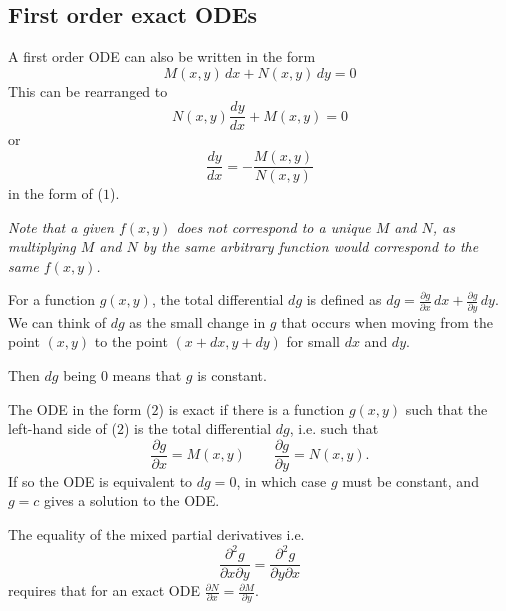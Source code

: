 \documentclass[10pt, a4paper]{article}
\begin{document}
\subsection{First order exact ODEs}
A first order ODE can also be written in the form
\begin{equation}
    M(x, y)\,dx + N(x, y)\,dy = 0
\end{equation}
This can be rearranged to
\[
N(x, y)\frac{dy}{dx} + M(x, y) = 0
\]
or
\[
\frac{dy}{dx} = -\frac{M(x, y)}{N(x, y)}
\]
in the form of ($1$).

\textit{Note that a given $f(x, y)$ does not correspond to a unique $M$ and $N$,
as multiplying $M$ and $N$ by the same arbitrary function would correspond to the same $f(x, y)$.}

For a function $g(x, y)$,
the total differential $dg$ is defined as $dg = \frac{\partial g}{\partial x}\,dx + \frac{\partial g}{\partial y}\,dy$.
We can think of $dg$ as the small change in $g$ that occurs when moving from the point $(x, y)$ to the point $(x + dx, y + dy)$ for small $dx$ and $dy$.

Then $dg$ being $0$ means that $g$ is constant.

The ODE in the form ($2$) is exact if there is a function $g(x, y)$ such that the left-hand side of ($2$) is the total differential $dg$,
i.e. such that
\[
\frac{\partial g}{\partial x} = M(x, y)\qquad\frac{\partial g}{\partial y} = N(x, y).
\]
If so the ODE is equivalent to $dg = 0$,
in which case $g$ must be constant,
and $g = c$ gives a solution to the ODE.

The equality of the mixed partial derivatives i.e.
\[
\frac{\partial ^ 2 g}{\partial x \partial y} = \frac{\partial ^ 2 g}{\partial y \partial x}
\]
requires that for an exact ODE $\frac{\partial N}{\partial x} = \frac{\partial M}{\partial y}$.
\end{document}

